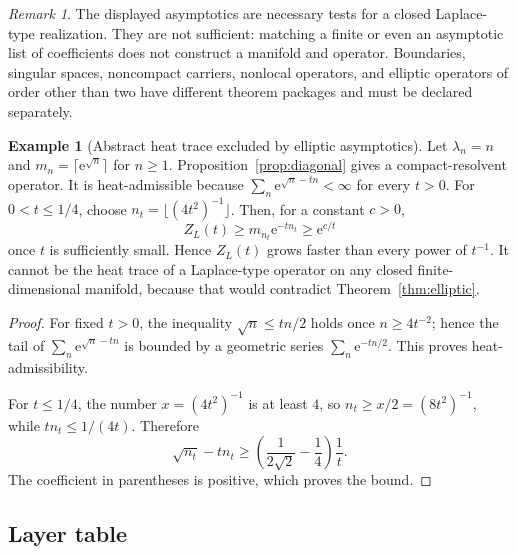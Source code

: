 \documentclass[11pt,a4paper]{article}
\theoremstyle{definition}
\newtheorem{example}[theorem]{Example}
\theoremstyle{remark}
\newtheorem{remark}[theorem]{Remark}
\newcommand{\e}{\mathrm e}
\begin{document}
\begin{remark}
The displayed asymptotics are necessary tests for a closed Laplace-type
realization. They are not sufficient: matching a finite or even an asymptotic
list of coefficients does not construct a manifold and operator.
Boundaries, singular spaces, noncompact carriers, nonlocal operators, and
elliptic operators of order other than two have different theorem packages and
must be declared separately.
\end{remark}

\begin{example}[Abstract heat trace excluded by elliptic asymptotics]
\label{ex:fast-multiplicity}
Let \(\lambda_n=n\) and \(m_n=\lceil\e^{\sqrt n}\rceil\) for \(n\geq1\).
Proposition~\ref{prop:diagonal} gives a compact-resolvent operator. It is
heat-admissible because
\(\sum_n\e^{\sqrt n-tn}<\infty\) for every \(t>0\).
For \(0<t\leq1/4\), choose
\(n_t=\lfloor(4t^2)^{-1}\rfloor\). Then, for a constant \(c>0\),
\[
 Z_L(t)\geq m_{n_t}\e^{-tn_t}\geq \e^{c/t}
\]
once \(t\) is sufficiently small. Hence \(Z_L(t)\) grows faster than every
power of \(t^{-1}\). It cannot be the heat trace of a Laplace-type operator on
any closed finite-dimensional manifold, because that would contradict
Theorem~\ref{thm:elliptic}.
\end{example}

\begin{proof}
For fixed \(t>0\), the inequality \(\sqrt n\leq tn/2\) holds once
\(n\geq4t^{-2}\); hence the tail of
\(\sum_n\e^{\sqrt n-tn}\) is bounded by a geometric series
\(\sum_n\e^{-tn/2}\). This proves heat-admissibility.

For \(t\leq1/4\), the number \(x=(4t^2)^{-1}\) is at least \(4\), so
\(n_t\geq x/2=(8t^2)^{-1}\), while \(tn_t\leq1/(4t)\). Therefore
\[
 \sqrt{n_t}-tn_t
 \geq
 \left(\frac1{2\sqrt2}-\frac14\right)\frac1t.
\]
The coefficient in parentheses is positive, which proves the bound.
\end{proof}

\subsection{Layer table}
\end{document}

